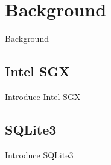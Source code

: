 \presec
\section{Background} \postsec
\label{sec:bkgrnd}
Background


\presub
\subsection{Intel SGX} \postsub
\label{subsec:sgx}
Introduce Intel SGX


\presub
\subsection{SQLite3} \postsub
\label{subsec:sqlite3}
Introduce SQLite3